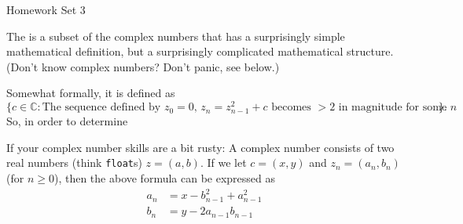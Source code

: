 \documentclass[11pt]{article}
\begin{document}
%
{Homework Set 3}

\bigskip
{}

The  is a subset of the complex numbers that has a surprisingly simple
mathematical definition, but a surprisingly complicated mathematical
structure. (Don't know complex numbers?  Don't panic, see below.)

Somewhat formally, it is defined as
\[
  \{c \in \mathbb C: \text{The sequence defined by $z_0=0$,
  $z_n=z_{n-1}^2 +c$ becomes $> 2$ in magnitude for some $n$}\}.
\]
So, in order to determine

If your complex number skills are a bit rusty: A complex number
consists of two real numbers (think \texttt{float}s) $z=(a,b)$.
If we let $c=(x,y)$ and $z_n=(a_n,b_n)$ (for $n\ge 0$), then the
above formula can be expressed as
\begin{align*}
  a_n &= x-b_{n-1}^2+a_{n-1}^2\\
  b_n &= y-2a_{n-1}b_{n-1}
\end{align*}
\end{document}
